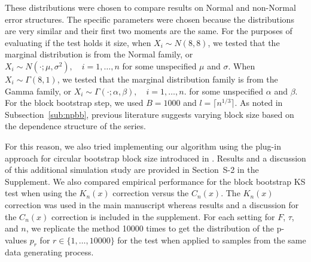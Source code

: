 \documentclass[12pt]{article}
\begin{document}
These distributions
were chosen to compare results on Normal and non-Normal
error structures. The specific parameters were chosen because the distributions
are very similar and their first two moments are the same. For the purposes of
evaluating if the test holds it size, when $X_i \sim N(8, 8)$, we tested that the
marginal distribution is from the
Normal family, or
$X_i \sim N(\cdot ; \mu, \sigma^2), \quad i = 1, \ldots, n$
for some unspecified $\mu$ and $\sigma$. When $X_i \sim \Gamma(8, 1)$, we tested
that the marginal distribution family is from the Gamma family,
or
$X_i \sim \Gamma(\cdot ; \alpha, \beta), \quad i = 1, \ldots, n$.
for some unspecified $\alpha$ and $\beta$. For the block bootstrap step,
we used $B = 1000$ and $l = \lceil n^{1/3} \rceil$.
As noted in Subsection~\ref{sub:npbb}, previous literature
suggests varying block size based on the dependence structure of the series.


For this reason, we also tried implementing our algorithm using the
plug-in approach for circular bootstrap block size introduced in
\citet{politis2004automatic}. Results and a discussion of this
additional simulation study are provided in Section~S-2
in the Supplement. We also compared empirical performance for the
block bootstrap KS test when using the $K_n(x)$ correction
versus the $C_n(x)$. The $K_n(x)$ correction was used
in the main manuscript whereas results and a discussion for the
$C_n(x)$ correction is included in the supplement.
For each setting for $F$, $\tau$, and $n$, we replicate the method
10000 times to get the distribution of the p-values $p_r$ for
$r \in \{1, \dots, 10000\}$
for the test when applied to samples from the same data generating
process.
\end{document}
